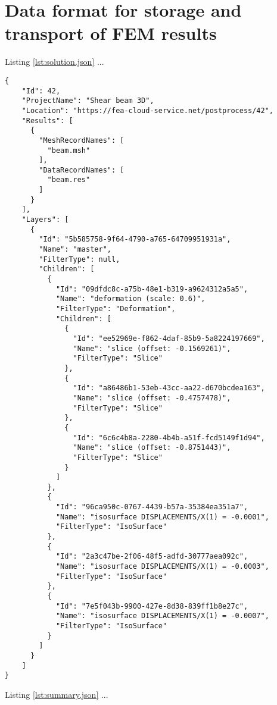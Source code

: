 \chapter{Data format for storage and transport of FEM results}
\label{appendix:data-format}


Listing \ref{lst:solution.json} ...

\begin{lstlisting}[style=json,caption=Example of solution.json document,label=lst:solution.json]
{
    "Id": 42,
    "ProjectName": "Shear beam 3D",
    "Location": "https://fea-cloud-service.net/postprocess/42",
    "Results": [
      {
        "MeshRecordNames": [
          "beam.msh"
        ],
        "DataRecordNames": [
          "beam.res"
        ]
      }
    ],
    "Layers": [
      {
        "Id": "5b585758-9f64-4790-a765-64709951931a",
        "Name": "master",
        "FilterType": null,
        "Children": [
          {
            "Id": "09dfdc8c-a75b-48e1-b319-a9624312a5a5",
            "Name": "deformation (scale: 0.6)",
            "FilterType": "Deformation",
            "Children": [
              {
                "Id": "ee52969e-f862-4daf-85b9-5a8224197669",
                "Name": "slice (offset: -0.1569261)",
                "FilterType": "Slice"
              },
              {
                "Id": "a86486b1-53eb-43cc-aa22-d670bcdea163",
                "Name": "slice (offset: -0.4757478)",
                "FilterType": "Slice"
              },
              {
                "Id": "6c6c4b8a-2280-4b4b-a51f-fcd5149f1d94",
                "Name": "slice (offset: -0.8751443)",
                "FilterType": "Slice"
              }
            ]
          },
          {
            "Id": "96ca950c-0767-4439-b57a-35384ea351a7",
            "Name": "isosurface DISPLACEMENTS/X(1) = -0.0001",
            "FilterType": "IsoSurface"
          },
          {
            "Id": "2a3c47be-2f06-48f5-adfd-30777aea092c",
            "Name": "isosurface DISPLACEMENTS/X(1) = -0.0003",
            "FilterType": "IsoSurface"
          },
          {
            "Id": "7e5f043b-9900-427e-8d38-839ff1b8e27c",
            "Name": "isosurface DISPLACEMENTS/X(1) = -0.0007",
            "FilterType": "IsoSurface"
          }
        ]
      }
    ]
}
\end{lstlisting}

Listing \ref{lst:summary.json} ...

